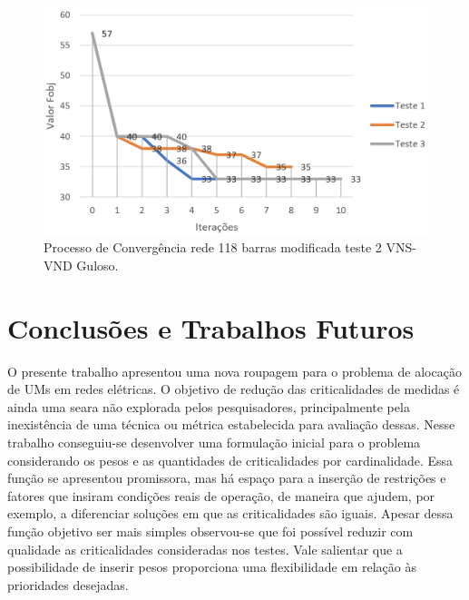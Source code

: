 \documentclass[12pt]{article}
\begin{document}
\begin{figure}[H]
	\centering 
	\includegraphics[scale=0.70]{figuras/VND_118_2_Guloso.jpg}
	\caption{Processo de Convergência rede 118 barras modificada teste 2 VNS-VND Guloso.}
	\label{fig19} %
\end{figure}


\section{Conclusões e Trabalhos Futuros}

O presente trabalho apresentou uma nova roupagem para o problema de alocação de UMs em redes elétricas. O objetivo de redução das criticalidades de medidas é ainda uma seara não explorada pelos pesquisadores, principalmente pela inexistência de uma técnica ou métrica estabelecida para avaliação dessas. Nesse trabalho conseguiu-se desenvolver uma formulação inicial para o problema considerando os pesos e as quantidades de criticalidades por cardinalidade. Essa função se apresentou promissora, mas há espaço para a inserção de restrições e fatores que insiram condições reais de operação, de maneira que ajudem, por exemplo, a diferenciar soluções em que as criticalidades são iguais. Apesar dessa função objetivo ser mais simples observou-se que foi possível reduzir com qualidade as criticalidades consideradas nos testes. Vale salientar que a possibilidade de inserir pesos proporciona uma flexibilidade em relação às prioridades desejadas.
\end{document}
